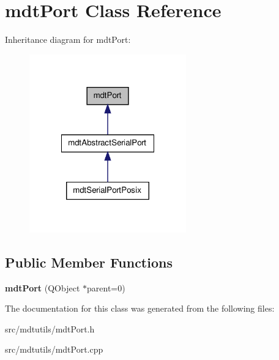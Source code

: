 \hypertarget{classmdt_port}{
\section{mdtPort Class Reference}
\label{classmdt_port}
}


Inheritance diagram for mdtPort:\nopagebreak
\begin{figure}[H]
\begin{center}
\leavevmode
\includegraphics[width=192pt]{classmdt_port__inherit__graph}
\end{center}
\end{figure}
\subsection*{Public Member Functions}
\begin{DoxyCompactItemize}
\item 
\hypertarget{classmdt_port_ac466eac9d1a54ea0e04c998660ad75ec}{
{\bfseries mdtPort} (QObject $\ast$parent=0)}
\label{classmdt_port_ac466eac9d1a54ea0e04c998660ad75ec}

\end{DoxyCompactItemize}


The documentation for this class was generated from the following files:\begin{DoxyCompactItemize}
\item 
src/mdtutils/mdtPort.h\item 
src/mdtutils/mdtPort.cpp\end{DoxyCompactItemize}
